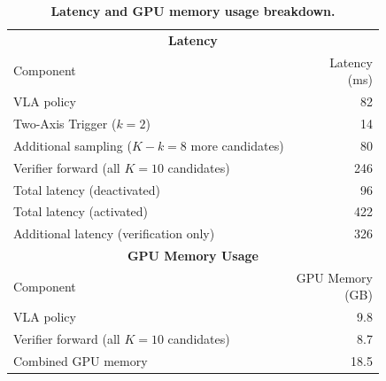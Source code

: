\documentclass[10pt,twocolumn,letterpaper]{article}
\begin{document}
\begin{table}[t]
\centering

\setlength{\tabcolsep}{3pt}
\caption{\textbf{Latency and GPU memory usage breakdown.}}
\label{tab:latency-gpu}
\begin{tabular}{p{}r}
\toprule
\multicolumn{2}{c}{\textbf{Latency}} \\
Component & \makecell{Latency\\(ms)} \\
\midrule
VLA policy & 82 \\
Two-Axis Trigger ($k{=}2$) & 14 \\
Additional sampling ($K{-}k{=}8$ more candidates) & 80 \\
Verifier forward (all $K{=}10$ candidates) & 246 \\
\midrule
Total latency (deactivated) & 96 \\
Total latency (activated) & 422 \\
Additional latency (verification only) & 326 \\
\midrule
\multicolumn{2}{c}{\textbf{GPU Memory Usage}} \\
Component & \makecell{GPU Memory\\(GB)} \\
\midrule
VLA policy & 9.8 \\
Verifier forward (all $K{=}10$ candidates) & 8.7 \\
\midrule
Combined GPU memory & 18.5 \\
\bottomrule
\end{tabular}



\end{table}
\end{document}
